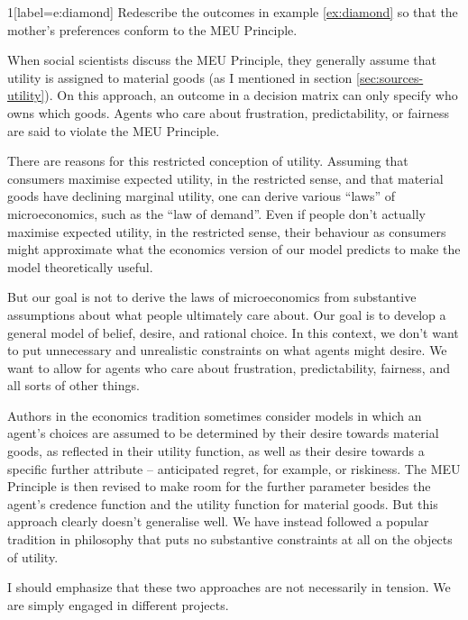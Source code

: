 \begin{exercise}{1}[label=e:diamond]
  Redescribe the outcomes in example \ref{ex:diamond} so that the mother's
  preferences conform to the MEU Principle.
\end{exercise}

When social scientists discuss the MEU Principle, they generally assume that
utility is assigned to material goods (as I mentioned in section
\ref{sec:sources-utility}). On this approach, an outcome in a decision matrix
can only specify who owns which goods. Agents who care about frustration,
predictability, or fairness are said to violate the MEU Principle.

There are reasons for this restricted conception of utility. Assuming that
consumers maximise expected utility, in the restricted sense, and that material
goods have declining marginal utility, one can derive various ``laws'' of
microeconomics, such as the ``law of demand''. Even if people don't actually
maximise expected utility, in the restricted sense, their behaviour as consumers
might approximate what the economics version of our model predicts to make the
model theoretically useful.

But our goal is not to derive the laws of microeconomics from substantive
assumptions about what people ultimately care about. Our goal is to develop a
general model of belief, desire, and rational choice. In this context, we don't
want to put unnecessary and unrealistic constraints on what agents might desire.
We want to allow for agents who care about frustration, predictability,
fairness, and all sorts of other things.

Authors in the economics tradition sometimes consider models in which an agent's
choices are assumed to be determined by their desire towards material goods, as
reflected in their utility function, as well as their desire towards a specific
further attribute -- anticipated regret, for example, or riskiness. The MEU
Principle is then revised to make room for the further parameter besides the
agent's credence function and the utility function for material goods. But this
approach clearly doesn't generalise well. We have instead followed a popular
tradition in philosophy that puts no substantive constraints at all on the
objects of utility.

I should emphasize that these two approaches are not necessarily in tension. We
are simply engaged in different projects.


